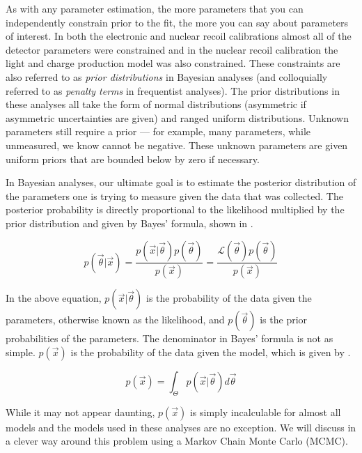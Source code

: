 As with any parameter estimation, the more parameters that you can independently constrain prior to the fit, the more you can say about parameters of interest.  In both the electronic and nuclear recoil calibrations almost all of the detector parameters were constrained and in the nuclear recoil calibration the light and charge production model was also constrained.  These constraints are also referred to as \textit{prior distributions} in Bayesian analyses (and colloquially referred to as \textit{penalty terms} in frequentist analyses).  The prior distributions in these analyses all take the form of normal distributions (asymmetric if asymmetric uncertainties are given) and ranged uniform distributions.  Unknown parameters still require a prior --- for example, many parameters, while unmeasured, we know cannot be negative.  These unknown parameters are given uniform priors that are bounded below by zero if necessary.


In Bayesian analyses, our ultimate goal is to estimate the posterior distribution of the parameters one is trying to measure given the data that was collected.  The posterior probability is directly proportional to the likelihood multiplied by the prior distribution and given by Bayes' formula, shown in  \cite{bayes1763essay}.

\begin{equation}
        \label{eqn:xe1t_bayes_formula}
        p(\vec{\theta}|\vec{x}) = \frac{p(\vec{x}|\vec{\theta}) p(\vec{\theta})}{p(\vec{x})} = \frac{\mathcal{L}(\vec{\theta}) p(\vec{\theta})}{p(\vec{x})}
\end{equation}


In the above equation, $p(\vec{x}|\vec{\theta})$ is the probability of the data given the parameters, otherwise known as the likelihood, and $p(\vec{\theta})$ is the prior probabilities of the parameters.  The denominator in Bayes' formula is not as simple.  $p(\vec{x})$ is the probability of the data given the model, which is given by .


\begin{equation}
        \label{eqn:xe1t_px}
        p(\vec{x}) = \int_{\Theta} p(\vec{x}|\vec{\theta}) d\vec{\theta}
\end{equation}


While it may not appear daunting, $p(\vec{x})$ is simply incalculable for almost all models and the models used in these analyses are no exception.  We will discuss in  a clever way around this problem using a Markov Chain Monte Carlo (MCMC).

